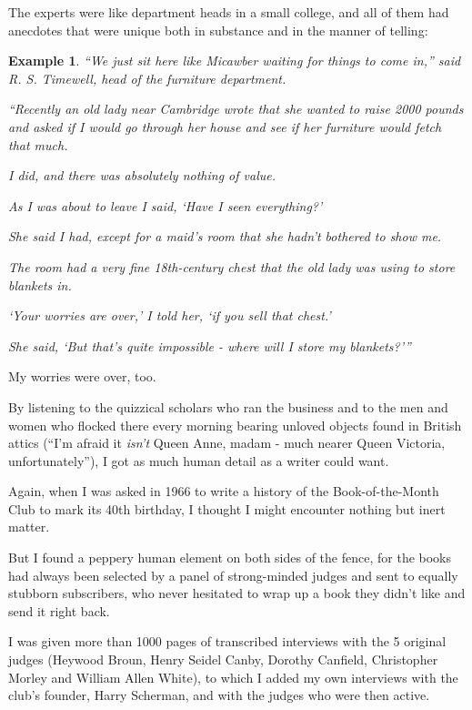 \documentclass{book}
\numberwithin{equation}{section}
\newtheorem{example}{Example}[chapter]
\begin{document}
The experts were like department heads in a small college, and all of them had anecdotes that were unique both in substance and in the manner of telling:
\begin{example}
    ``We just sit here like Micawber waiting for things to come in,'' said R. S. Timewell, head of the furniture department.
    
    ``Recently an old lady near Cambridge wrote that she wanted to raise 2000 pounds and asked if I would go through her house and see if her furniture would fetch that much.
    
    I did, and there was absolutely nothing of value.
    
    As I was about to leave I said, `Have I seen \emph{every}thing?'
    
    She said I had, except for a maid's room that she hadn't bothered to show me.
    
    The room had a very fine 18th-century chest that the old lady was using to store blankets in.
    
    `Your worries are over,' I told her, `if you sell that chest.'
    
    She said, `But that's quite impossible - where will I store my blankets?'''
\end{example}
My worries were over, too.

By listening to the quizzical scholars who ran the business and to the men and women who flocked there every morning bearing unloved objects found in British attics (``I'm afraid it \textit{isn't} Queen Anne, madam - much nearer Queen Victoria, unfortunately''), I got as much human detail as a writer could want.

%
Again, when I was asked in 1966 to write a history of the Book-of-the-Month Club to mark its 40th birthday, I thought I might encounter nothing but inert matter.

But I found a peppery human element on both sides of the fence, for the books had always been selected by a panel of strong-minded judges and sent to equally stubborn subscribers, who never hesitated to wrap up a book they didn't like and send it right back.

I was given more than 1000 pages of transcribed interviews with the 5 original judges (Heywood Broun, Henry Seidel Canby, Dorothy Canfield, Christopher Morley and William Allen White), to which I added my own interviews with the club's founder, Harry Scherman, and with the judges who were then active.
\end{document}
